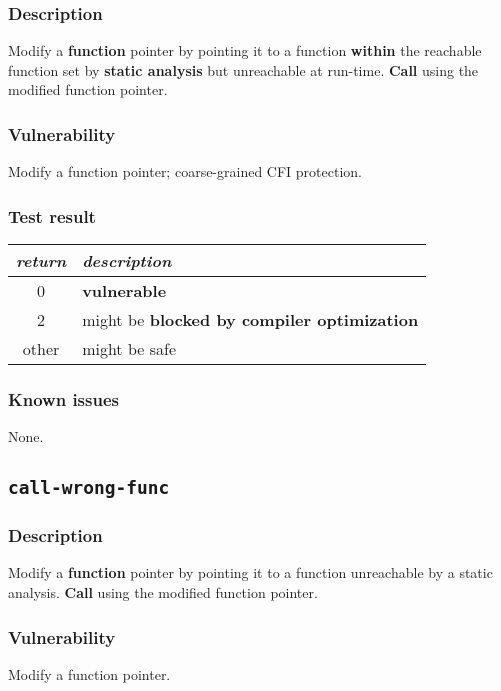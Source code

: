 \documentclass[a4paper]{book}
\begin{document}
\subsubsection{Description}
Modify a \textbf{function} pointer by pointing it to a function \textbf{within} the reachable function set by \textbf{static analysis} but unreachable at run-time.
\textbf{Call} using the modified function pointer.

\subsubsection{Vulnerability}
Modify a function pointer; coarse-grained CFI protection.

\subsubsection{Test result}
\begin{tabular}{cl}
  \toprule
  \emph{return}  & \emph{description} \\
  \midrule
  0              & \textbf{vulnerable} \\
  2              & might be \textbf{blocked by compiler optimization} \\
  other          & might be safe \\
  \bottomrule
\end{tabular}
  
\subsubsection{Known issues}

None.

\newpage

\subsection{\texttt{call-wrong-func}}\label{test-call-wrong-func}

\subsubsection{Description}
Modify a \textbf{function} pointer by pointing it to a function unreachable by a static analysis.
\textbf{Call} using the modified function pointer.

\subsubsection{Vulnerability}
Modify a function pointer.
\end{document}

